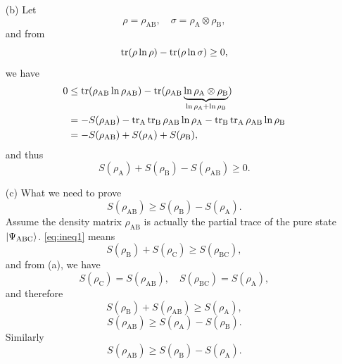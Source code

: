 \documentclass[hyperref, a4paper]{article}
\begin{document}
\begin{itemize}
\item[(b)] Let 
\[
    \rho = \rho_{\text{AB}}, \quad \sigma = \rho_{\text{A}} \otimes \rho_{\text{B}},
\]
and from 
\[
    \trace (\rho \ln \rho ) - \trace (\rho \ln \sigma) \geq 0,
\]
we have 
\[
    \begin{aligned}
        0 &\leq \trace (\rho_{\text{AB}} \ln \rho_{\text{AB}} ) 
        - \trace (\rho_{\text{AB}} 
        \underbrace{\ln \rho_{\text{A}} \otimes \rho_{\text{B}}}_{\ln \rho_{\text{A}} + \ln \rho_{\text{B}}}) \\
        &= - S(\rho_{\text{AB}})
        - \trace_{\text{A}} \trace_{\text{B}} \rho_{\text{AB}} \ln \rho_{\text{A}}
        - \trace_{\text{B}} \trace_{\text{A}} \rho_{\text{AB}} \ln \rho_{\text{B}} \\
        &= - S(\rho_{\text{AB}}) + S(\rho_{\text{A}}) + S(\rho_{\text{B}}),
    \end{aligned}
\]
and thus 
\begin{equation}
    S(\rho_{\text{A}}) + S(\rho_{\text{B}}) - S(\rho_{\text{AB}}) \geq 0.
    \label{eq:ineq1}
\end{equation}

\item[(c)] What we need to prove 
\begin{equation}
    S(\rho_{\text{AB}}) \geq S(\rho_{\text{B}}) - S(\rho_{\text{A}}).
\end{equation}
Assume the density matrix $\rho_{\text{AB}}$ is actually 
the partial trace of the pure state $\ket{\Psi_{\text{ABC}}}$.
\eqref{eq:ineq1} means 
\[
    S(\rho_{\text{B}}) + S(\rho_{\text{C}}) \geq S(\rho_{\text{BC}}) ,
\]
and from (a), we have
\[
    S(\rho_{\text{C}}) = S(\rho_{\text{AB}}), \quad 
    S(\rho_{\text{BC}}) = S(\rho_{\text{A}}),
\]
and therefore 
\[
    S(\rho_{\text{B}}) + S(\rho_{\text{AB}}) \geq S(\rho_{\text{A}}),
\]
\begin{equation}
    S(\rho_{\text{AB}}) \geq S(\rho_{\text{A}}) - S(\rho_{\text{B}}).
\end{equation}
Similarly 
\begin{equation}
    S(\rho_{\text{AB}}) \geq S(\rho_{\text{B}}) - S(\rho_{\text{A}}).
\end{equation}


\end{itemize}
\end{document}
